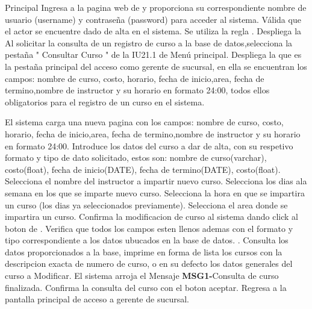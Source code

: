 	\newpage
	\begin{UCtrayectoria}{Principal}
	\UCpaso[\UCactor] Ingresa a la pagina web de \label{CU24.0Login} y proporciona su correspondiente nombre de usuario (username) y contraseña (password) para acceder al sistema.
		\UCpaso Válida que el actor se encuentre dado de alta en el sistema. Se utiliza la regla  .
		\UCpaso Despliega la 
		\UCpaso[\UCactor] Al solicitar la consulta de un registro de curso a la base de datos,selecciona la pestaña " Consultar Curso " de la IU21.1 de Menú principal.
		\UCpaso Despliega la  que es la pestaña principal del acceso como gerente de sucursal, en ella se encuentran los campos: nombre de curso, costo, horario, fecha de inicio,area, fecha de termino,nombre de instructor y su  horario en formato 24:00, todos ellos obligatorios para el registro de un curso en el sistema.
	
	\UCpaso El sistema carga una nueva pagina con los campos: nombre de curso, costo, horario, fecha de inicio,area, fecha de termino,nombre de instructor y su  horario en formato 24:00.
	\UCpaso[\UCactor] Introduce los datos del curso a dar de alta, con su respetivo formato y tipo de dato solicitado, estos son: nombre de curso(varchar), costo(float), fecha de inicio(DATE), fecha de termino(DATE), costo(float).
    \UCpaso[\UCactor] Selecciona el nombre del instructor a impartir nuevo curso.
	\UCpaso[\UCactor] Selecciona los dias ala semana en los que se imparte nuevo curso.
	\UCpaso[\UCactor] Selecciona la hora en que se impartira un curso (los dias ya seleccionados previamente).
	\UCpaso[\UCactor] Selecciona el area donde se impartira un curso.
	\UCpaso[\UCactor] Confirma la modificacion de curso al sistema dando click al boton  de \label{IU24.1 Consultar Curso}.
	\UCpaso Verifica que todos los campos esten llenos ademas con el formato y tipo correspondiente a los datos ubucados en la base de datos.  .
		\UCpaso Consulta los datos proporcionados a la base, imprime  en forma de lista los cursos con la descripcion exacta de numero de curso, o en su defecto los datos generales del curso a Modificar.
	\UCpaso El sistema arroja el Mensaje {\bf MSG1-}Consulta de curso finalizada.
	\UCpaso[\UCactor] Confirma la consulta del curso con el boton aceptar.
	\UCpaso Regresa a la pantalla principal de acceso a gerente de sucursal.
\end{UCtrayectoria}

